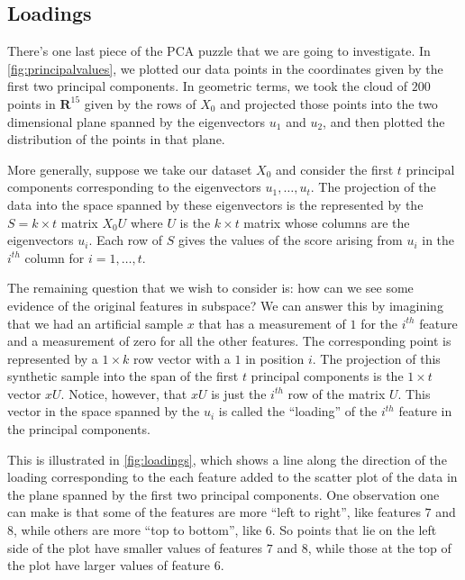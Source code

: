 \documentclass[
  oneside]{scrbook}
\begin{document}
\hypertarget{loadings}{%
\subsection{Loadings}\label{loadings}}

There's one last piece of the PCA puzzle that we are going to
investigate. In \cref{fig:principalvalues}, we plotted our data points
in the coordinates given by the first two principal components. In
geometric terms, we took the cloud of \(200\) points in
\(\mathbf{R}^{15}\) given by the rows of \(X_{0}\) and projected those
points into the two dimensional plane spanned by the eigenvectors
\(u_{1}\) and \(u_{2}\), and then plotted the distribution of the points
in that plane.

More generally, suppose we take our dataset \(X_{0}\) and consider the
first \(t\) principal components corresponding to the eigenvectors
\(u_{1},\ldots, u_{t}\). The projection of the data into the space
spanned by these eigenvectors is the represented by the
\(S = k\times t\) matrix \(X_{0}U\) where \(U\) is the \(k\times t\)
matrix whose columns are the eigenvectors \(u_{i}\). Each row of \(S\)
gives the values of the score arising from \(u_{i}\) in the \(i^{th}\)
column for \(i=1,\ldots, t\).

The remaining question that we wish to consider is: how can we see some
evidence of the original features in subspace? We can answer this by
imagining that we had an artificial sample \(x\) that has a measurement
of \(1\) for the \(i^{th}\) feature and a measurement of zero for all
the other features. The corresponding point is represented by a
\(1\times k\) row vector with a \(1\) in position \(i\). The projection
of this synthetic sample into the span of the first \(t\) principal
components is the \(1\times t\) vector \(xU\). Notice, however, that
\(xU\) is just the \(i^{th}\) row of the matrix \(U\). This vector in
the space spanned by the \(u_{i}\) is called the ``loading'' of the
\(i^{th}\) feature in the principal components.

This is illustrated in \cref{fig:loadings}, which shows a line along the
direction of the loading corresponding to the each feature added to the
scatter plot of the data in the plane spanned by the first two principal
components. One observation one can make is that some of the features
are more ``left to right'', like features \(7\) and \(8\), while others
are more ``top to bottom'', like \(6\). So points that lie on the left
side of the plot have smaller values of features \(7\) and \(8\), while
those at the top of the plot have larger values of feature \(6\).
\end{document}
